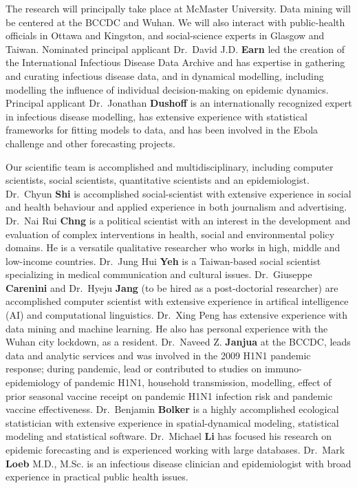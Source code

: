 
The research will principally take place at McMaster University. Data mining will be centered at the BCCDC and Wuhan. We will also interact with public-health officials in Ottawa and Kingston, and social-science experts in Glasgow and Taiwan.
Nominated principal applicant Dr.\ David J.D. \textbf{Earn} led the creation of the International Infectious Disease Data Archive and has expertise in gathering and curating infectious disease data, and in dynamical modelling, including modelling the influence of individual decision-making on epidemic dynamics.
Principal applicant Dr.\ Jonathan \textbf{Dushoff} is an internationally recognized expert in infectious disease modelling, has extensive experience with statistical frameworks for fitting models to data, and has been involved in the Ebola challenge and other forecasting projects.

Our scientific team is accomplished and multidisciplinary, including computer scientists, social scientists, quantitative scientists and an epidemiologist. 
Dr.\ Chyun \textbf{Shi} is accomplished social-scientist with extensive experience in social and health behaviour and applied experience in both journalism and advertising. 
Dr.\ Nai Rui \textbf{Chng} is a political scientist with an interest in the development and evaluation of complex interventions in health, social and environmental policy domains. He is a versatile qualitative researcher who works in high, middle and low-income countries.
Dr.\ Jung Hui \textbf{Yeh} is a Taiwan-based social scientist specializing in medical communication and cultural issues.
Dr.\ Giuseppe \textbf{Carenini} and Dr.\ Hyeju \textbf{Jang} (to be hired as a post-doctorial researcher) are accomplished computer scientist with extensive experience in artifical intelligence (AI) and computational linguistics.
Dr.\ Xing Peng  has extensive experience with data mining and machine learning. He also has personal experience with the Wuhan city lockdown, as a resident.
Dr.\ Naveed Z. \textbf{Janjua} at the BCCDC, leads data and analytic services and was involved in the 2009 H1N1 pandemic response; during pandemic, lead or contributed to studies on  immuno-epidemiology of pandemic H1N1, household transmission, modelling, effect of prior seasonal vaccine receipt on pandemic H1N1 infection risk and pandemic vaccine effectiveness. 
Dr.\ Benjamin \textbf{Bolker} is a highly accomplished ecological statistician with extensive experience in spatial-dynamical modeling, statistical modeling and statistical software.
Dr.\ Michael \textbf{Li} has focused his research on epidemic forecasting and is experienced working with large databases. 
Dr.\ Mark \textbf{Loeb} M.D., M.Sc. is an infectious disease clinician and epidemiologist with broad experience in practical public health issues.

